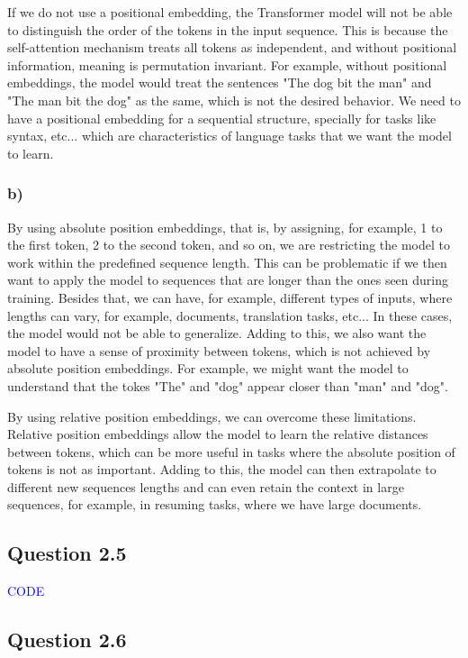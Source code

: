 \documentclass{article}
\begin{document}
If we do not use a positional embedding, the Transformer model will not be able to distinguish the order of the tokens in the
input sequence. This is because the self-attention mechanism treats all tokens as independent, and without positional information,
meaning is permutation invariant. For example, without positional embeddings, the model would treat the sentences "The dog bit the man"
and "The man bit the dog" as the same, which is not the desired behavior. We need to have a positional embedding
for a sequential structure, specially for tasks like syntax, etc... which are characteristics of language tasks that we
want the model to learn.

\subsubsection*{b)}

By using absolute position embeddings, that is, by assigning, for example, 1 to the first token, 2 to the second token, and so on,
we are restricting the model to work within the predefined sequence length. This can be problematic if we then want to apply the model
to sequences that are longer than the ones seen during training. Besides that, we can have, for example, different types of inputs, 
where lengths can vary, for example, documents, translation tasks, etc... In these cases, the model would not be able to generalize.
Adding to this, we also want the model to have a sense of proximity between tokens, which is not achieved by absolute position embeddings.
For example, we might want the model to understand that the tokes "The" and "dog" appear closer than "man" and "dog".

By using relative position embeddings, we can overcome these limitations. Relative position embeddings allow the model to learn
the relative distances between tokens, which can be more useful in tasks where the absolute position of tokens is not as important.
Adding to this, the model can then extrapolate to different new sequences lengths and can even retain the context in large
sequences, for example, in resuming tasks, where we have large documents.


\subsection*{Question 2.5}

\textcolor{blue}{CODE}

\subsection*{Question 2.6}
\end{document}
